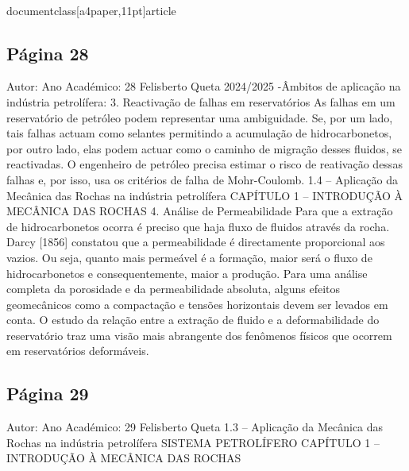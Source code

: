 \\documentclass[a4paper,11pt]{article}
\begin{document}
\subsection*{Página 28}
Autor:
Ano Académico:
28
Felisberto Queta
2024/2025
-Âmbitos de aplicação na indústria petrolífera:
3. Reactivação de falhas em reservatórios
As falhas em um reservatório de petróleo podem representar uma ambiguidade.
Se, por um lado, tais falhas actuam como selantes permitindo a acumulação de hidrocarbonetos, por outro lado, 
elas podem actuar como o caminho de migração desses fluidos, se reactivadas.
O engenheiro de petróleo precisa estimar o risco de reativação dessas falhas e, por isso, usa os critérios de falha 
de Mohr-Coulomb.
1.4 – Aplicação da Mecânica das Rochas na indústria petrolífera
CAPÍTULO 1 – INTRODUÇÃO À MECÂNICA DAS ROCHAS
4. Análise de Permeabilidade
Para que a extração de hidrocarbonetos ocorra é preciso que haja fluxo de fluidos através da rocha. Darcy [1856]
constatou que a permeabilidade é directamente proporcional aos vazios. Ou seja, quanto mais permeável é a
formação, maior será o fluxo de hidrocarbonetos e consequentemente, maior a produção.
Para uma análise completa da porosidade e da permeabilidade absoluta, alguns efeitos geomecânicos como a
compactação e tensões horizontais devem ser levados em conta.
O estudo da relação entre a extração de fluido e a deformabilidade do reservatório traz uma visão mais
abrangente dos fenômenos físicos que ocorrem em reservatórios deformáveis.



\subsection*{Página 29}
Autor:
Ano Académico:
29
Felisberto Queta
1.3 – Aplicação da Mecânica das Rochas na indústria petrolífera
SISTEMA PETROLÍFERO
CAPÍTULO 1 – INTRODUÇÃO À MECÂNICA DAS ROCHAS
\end{document}

